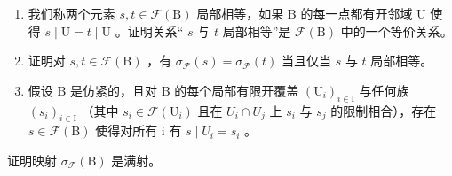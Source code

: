 \begin{enumerate}
\def\labelenumi{\alph{enumi})}
\item
  我们称两个元素 \(s, t \in \mathcal{F}(\mathrm{B})\) 局部相等，如果 B 的每一点都有开邻域 U 使得 \(s \mid \mathrm{U} = t \mid \mathrm{U}\) 。证明关系“ \(s\) 与 \(t\) 局部相等”是 \(\mathcal{F}(\mathrm{B})\) 中的一个等价关系。
\item
  证明对 \(s, t \in \mathcal{F}(\mathrm{B})\) ，有 \(\sigma_{\mathcal{F}}(s) = \sigma_{\mathcal{F}}(t)\) 当且仅当 \(s\) 与 \(t\) 局部相等。
\item
  假设 B 是仿紧的，且对 B 的每个局部有限开覆盖 \((\mathrm{U}_{i})_{i\in\mathrm{I}}\) 与任何族 \((s_{i})_{i\in\mathrm{I}}\) （其中 \(s_{i}\in\mathcal{F}(\mathrm{U}_{i})\) 且在 \(U_{i}\cap U_{j}\) 上 \(s_{i}\) 与 \(s_{j}\) 的限制相合），存在 \(s\in\mathcal{F}(\mathrm{B})\) 使得对所有 i 有 \(s\mid U_{i}=s_{i}\) 。
\end{enumerate}

证明映射 \(\sigma_{\mathcal{F}}(\mathrm{B})\) 是满射。

